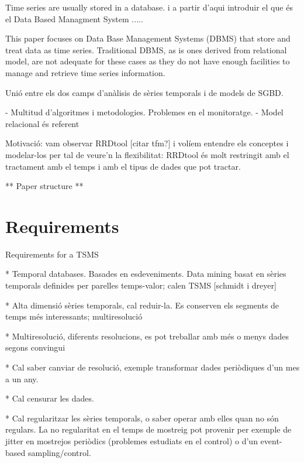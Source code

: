 \documentclass{scrartcl}
\begin{document}
Time series are usually stored in a database.     i a partir d'aqui introduir el que és el Data Based Managment System .....






This paper focuses on Data Base Management Systems (DBMS) that store
and treat data as time series. Traditional DBMS, as is ones derived
from relational model, are not adequate for these cases as they do not
have enough facilities to manage and retrieve time series
information.



Unió entre els dos camps d'anàlisis de sèries temporals i de models de SGBD. 

- Multitud d'algoritmes i metodologies. Problemes en el monitoratge.
- Model relacional és referent




Motivació: vam observar RRDtool [citar tfm?] i volíem entendre els conceptes i modelar-los per tal de veure'n la flexibilitat: RRDtool és molt restringit amb el tractament amb el temps i amb el tipus de dades que pot tractar.



** Paper structure **



\section{Requirements}

Requirements for a TSMS


* Temporal databases. Basades en esdeveniments. Data mining basat en sèries temporals definides per parelles temps-valor; calen TSMS [schmidt i dreyer] 

* Alta dimensió sèries temporals, cal reduir-la. Es conserven els segments de temps més interessants; multiresolució

* Multiresolució, diferents resolucions, es pot treballar amb més o menys dades segons convingui

* Cal saber canviar de resolució, exemple transformar dades periòdiques d'un mes a un any.

* Cal censurar les dades.

* Cal regularitzar les sèries temporals, o saber operar amb elles quan no són regulars. La no regularitat en el temps de mostreig pot provenir per exemple de jitter en mostrejos periòdics (problemes estudiats en el control) o d'un event-based sampling/control.
\end{document}
